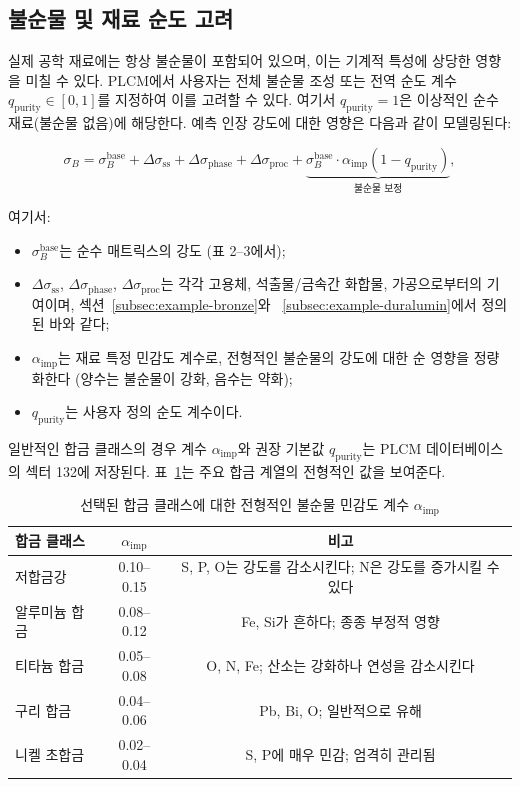 \documentclass[12pt,a4paper]{article}
\begin{document}
	\subsection{불순물 및 재료 순도 고려}
	\label{subsec:purity}
	
	실제 공학 재료에는 항상 불순물이 포함되어 있으며, 이는 기계적 특성에 상당한 영향을 미칠 수 있다. PLCM에서 사용자는 전체 불순물 조성 또는 전역 순도 계수 \(q_{\mathrm{purity}} \in [0,1]\)를 지정하여 이를 고려할 수 있다. 여기서 \(q_{\mathrm{purity}}=1\)은 이상적인 순수 재료(불순물 없음)에 해당한다. 예측 인장 강도에 대한 영향은 다음과 같이 모델링된다:
	
	\[
	\sigma_B = \sigma_B^{\mathrm{base}} + \Delta\sigma_{\mathrm{ss}} + \Delta\sigma_{\mathrm{phase}} + \Delta\sigma_{\mathrm{proc}} + \underbrace{\sigma_B^{\mathrm{base}} \cdot \alpha_{\mathrm{imp}} (1 - q_{\mathrm{purity}})}_{\text{불순물 보정}},
	\]
	
	여기서:
	\begin{itemize}
		\item \(\sigma_B^{\mathrm{base}}\)는 순수 매트릭스의 강도 (표 2–3에서);
		\item \(\Delta\sigma_{\mathrm{ss}}\), \(\Delta\sigma_{\mathrm{phase}}\), \(\Delta\sigma_{\mathrm{proc}}\)는 각각 고용체, 석출물/금속간 화합물, 가공으로부터의 기여이며, 섹션~\ref{subsec:example-bronze}와 ~\ref{subsec:example-duralumin}에서 정의된 바와 같다;
		\item \(\alpha_{\mathrm{imp}}\)는 재료 특정 민감도 계수로, 전형적인 불순물의 강도에 대한 순 영향을 정량화한다 (양수는 불순물이 강화, 음수는 약화);
		\item \(q_{\mathrm{purity}}\)는 사용자 정의 순도 계수이다.
	\end{itemize}
	
	일반적인 합금 클래스의 경우 계수 \(\alpha_{\mathrm{imp}}\)와 권장 기본값 \(q_{\mathrm{purity}}\)는 PLCM 데이터베이스의 섹터 132에 저장된다. 표~\ref{tab:impurity-coefficients}는 주요 합금 계열의 전형적인 값을 보여준다.
	
	\begin{table}[htbp]
		\centering
		\caption{선택된 합금 클래스에 대한 전형적인 불순물 민감도 계수 \(\alpha_{\mathrm{imp}}\)}
		\label{tab:impurity-coefficients}
		\begin{tabular}{lcc}
			\toprule
			\textbf{합금 클래스} & \(\alpha_{\mathrm{imp}}\) & \textbf{비고} \\
			\midrule
			저합금강 & 0.10–0.15 & S, P, O는 강도를 감소시킨다; N은 강도를 증가시킬 수 있다 \\
			알루미늄 합금 & 0.08–0.12 & Fe, Si가 흔하다; 종종 부정적 영향 \\
			티타늄 합금 & 0.05–0.08 & O, N, Fe; 산소는 강화하나 연성을 감소시킨다 \\
			구리 합금 & 0.04–0.06 & Pb, Bi, O; 일반적으로 유해 \\
			니켈 초합금 & 0.02–0.04 & S, P에 매우 민감; 엄격히 관리됨 \\
			\bottomrule
		\end{tabular}
	\end{table}
	
\end{document}
